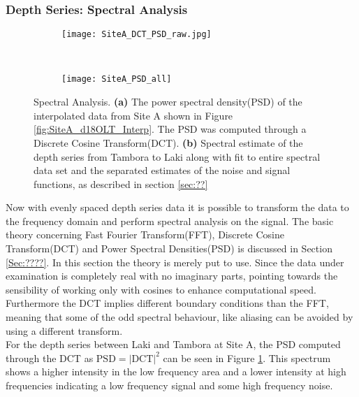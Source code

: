 \documentclass[../../CompleteThesis/Complete_1stDraft.tex]{subfiles}
\begin{document}
\subsubsection[Spectral Analysis]{Depth Series: Spectral Analysis}
\begin{figure}[h]
	\centering
	\begin{subfigure}{.45\textwidth}
		\centering
		\texttt{[image: SiteA\_DCT\_PSD\_raw.jpg]}
		\caption[PSD of LT data, Site A]{}
		\label{fig:SiteA_DCT_PSD_raw}
	\end{subfigure}
	~
	\begin{subfigure}{0.45\textwidth}
		\texttt{[image: SiteA\_PSD\_all]}
		\caption[Spectral fit, Site A]{}%
		\label{fig:SiteA_SpectralFitsAll}
	\end{subfigure}
	\caption[Spectral Analysis]{Spectral Analysis. \textbf{(a)} The power spectral density(PSD) of the interpolated data from Site A shown in Figure \ref{fig:SiteA_d18OLT_Interp}. The PSD was computed through a Discrete Cosine Transform(DCT). \textbf{(b)} Spectral estimate of the depth series from Tambora to Laki along with fit to entire spectral data set and the separated estimates of the noise and signal functions, as described in section \ref{sec:??}}
	\label{fig:SiteA_SpectralAnalysis}
\end{figure}
Now with evenly spaced depth series data it is possible to transform the data to the frequency domain and perform spectral analysis on the signal. The basic theory concerning Fast Fourier Transform(FFT), Discrete Cosine Transform(DCT) and Power Spectral Densities(PSD) is discussed in Section \ref{Sec:????}. In this section the theory is merely put to use. Since the data under examination is completely real with no imaginary parts, pointing towards the sensibility of working only with cosines to enhance computational speed. Furthermore the DCT implies different boundary conditions than the FFT, meaning that some of the odd spectral behaviour, like aliasing can be avoided by using a different transform.\\
For the depth series between Laki and Tambora at Site A, the PSD computed through the DCT as $\text{PSD} = |\text{DCT}|^2$ can be seen in Figure \ref{fig:SiteA_DCT_PSD_raw}. This spectrum shows a higher intensity in the low frequency area and a lower intensity at high frequencies indicating a low frequency signal and some high frequency noise.
\end{document}
